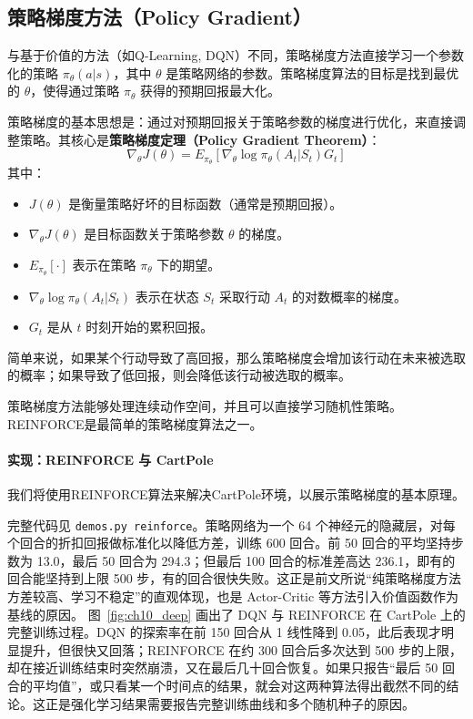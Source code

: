 \subsection{策略梯度方法（Policy Gradient）}
与基于价值的方法（如Q-Learning, DQN）不同，策略梯度方法直接学习一个参数化的策略 $\pi_\theta(a|s)$，其中 $\theta$ 是策略网络的参数。策略梯度算法的目标是找到最优的 $\theta$，使得通过策略 $\pi_\theta$ 获得的预期回报最大化。

策略梯度的基本思想是：通过对预期回报关于策略参数的梯度进行优化，来直接调整策略。其核心是\textbf{策略梯度定理（Policy Gradient Theorem）}：
$$ \nabla_\theta J(\theta) = E_{\pi_\theta} \left[ \nabla_\theta \log \pi_\theta(A_t|S_t) G_t \right] $$
其中：
\begin{itemize}
    \item $J(\theta)$ 是衡量策略好坏的目标函数（通常是预期回报）。
    \item $\nabla_\theta J(\theta)$ 是目标函数关于策略参数 $\theta$ 的梯度。
    \item $E_{\pi_\theta}[\cdot]$ 表示在策略 $\pi_\theta$ 下的期望。
    \item $\nabla_\theta \log \pi_\theta(A_t|S_t)$ 表示在状态 $S_t$ 采取行动 $A_t$ 的对数概率的梯度。
    \item $G_t$ 是从 $t$ 时刻开始的累积回报。
\end{itemize}
简单来说，如果某个行动导致了高回报，那么策略梯度会增加该行动在未来被选取的概率；如果导致了低回报，则会降低该行动被选取的概率。

策略梯度方法能够处理连续动作空间，并且可以直接学习随机性策略。REINFORCE是最简单的策略梯度算法之一。

\paragraph{实现：REINFORCE 与 CartPole}
我们将使用REINFORCE算法来解决CartPole环境，以展示策略梯度的基本原理。

完整代码见 \texttt{demos.py reinforce}。策略网络为一个 64 个神经元的隐藏层，对每个回合的折扣回报做标准化以降低方差，训练 600 回合。前 50 回合的平均坚持步数为 13.0，最后 50 回合为 294.3；但最后 100 回合的标准差高达 236.1，即有的回合能坚持到上限 500 步，有的回合很快失败。这正是前文所说“纯策略梯度方法方差较高、学习不稳定”的直观体现，也是 Actor-Critic 等方法引入价值函数作为基线的原因。
图~\ref{fig:ch10_deep} 画出了 DQN 与 REINFORCE 在 CartPole 上的完整训练过程。DQN 的探索率在前 150 回合从 1 线性降到 0.05，此后表现才明显提升，但很快又回落；REINFORCE 在约 300 回合后多次达到 500 步的上限，却在接近训练结束时突然崩溃，又在最后几十回合恢复。如果只报告“最后 50 回合的平均值”，或只看某一个时间点的结果，就会对这两种算法得出截然不同的结论。这正是强化学习结果需要报告完整训练曲线和多个随机种子的原因。

